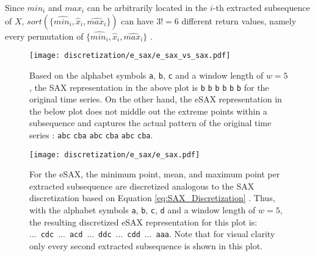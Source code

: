Since $min_i$ and $max_i$ can be arbitrarily located in the $i$-th extracted subsequence of $X$, $sort(\{\hat{min_i}, \hat{x}_i, \hat{max_i}\})$ can have $3! = 6$ different return values, namely every permutation of $\{\hat{min_i}, \hat{x}_i, \hat{max_i}\}$ \cite{E_SAX}.
\begin{figure}[htb]
\centering
\texttt{[image: discretization/e\_sax/e\_sax\_vs\_sax.pdf]}
\caption[Extended Symbolic Aggregate Approximation - SAX vs. eSAX]{Based on the alphabet symbols \texttt{a}, \texttt{b}, \texttt{c} and a window length of $w = 5$, the \ac{SAX} representation in the above plot is \texttt{b} \texttt{b} \texttt{b} \texttt{b} \texttt{b} \texttt{b} for the original time series. On the other hand, the \ac{eSAX} representation in the below plot does not middle out the extreme points within a subsequence and captures the actual pattern of the original time series \cite{E_SAX}: \texttt{a}\texttt{b}\texttt{c} \texttt{c}\texttt{b}\texttt{a} \texttt{a}\texttt{b}\texttt{c} \texttt{c}\texttt{b}\texttt{a} \texttt{a}\texttt{b}\texttt{c} \texttt{c}\texttt{b}\texttt{a}.}
\label{fig:SAX_E_SAX}
\end{figure}
\begin{figure}[htb]
\centering
\texttt{[image: discretization/e\_sax/e\_sax.pdf]}
\caption[Extended Symbolic Aggregate Approximation - Discretization]{For the \ac{eSAX}, the minimum point, mean, and maximum point per extracted subsequence are discretized analogous to the \ac{SAX} discretization based on Equation \ref{eq:SAX_Discretization} \cite{E_SAX}. Thus, with the alphabet symbols \texttt{a}, \texttt{b}, \texttt{c}, \texttt{d} and a window length of $w = 5$, the resulting discretized \ac{eSAX} representation for this plot  is: \mbox{... \texttt{c}\texttt{d}\texttt{c} ... \texttt{a}\texttt{c}\texttt{d} ... \texttt{d}\texttt{d}\texttt{c} ... \texttt{c}\texttt{d}\texttt{d} ... \texttt{a}\texttt{a}\texttt{a}}. Note that for visual clarity only every second extracted subsequence is shown in this plot.}
\label{fig:E_SAX}
\end{figure}
